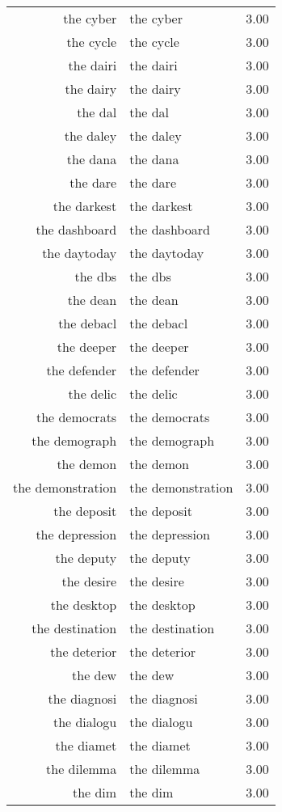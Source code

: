 \begin{table}[ht]
\begin{tabular}{rlr}
  the cyber & the cyber & 3.00 \\ 
  the cycle & the cycle & 3.00 \\ 
  the dairi & the dairi & 3.00 \\ 
  the dairy & the dairy & 3.00 \\ 
  the dal & the dal & 3.00 \\ 
  the daley & the daley & 3.00 \\ 
  the dana & the dana & 3.00 \\ 
  the dare & the dare & 3.00 \\ 
  the darkest & the darkest & 3.00 \\ 
  the dashboard & the dashboard & 3.00 \\ 
  the daytoday & the daytoday & 3.00 \\ 
  the dbs & the dbs & 3.00 \\ 
  the dean & the dean & 3.00 \\ 
  the debacl & the debacl & 3.00 \\ 
  the deeper & the deeper & 3.00 \\ 
  the defender & the defender & 3.00 \\ 
  the delic & the delic & 3.00 \\ 
  the democrats & the democrats & 3.00 \\ 
  the demograph & the demograph & 3.00 \\ 
  the demon & the demon & 3.00 \\ 
  the demonstration & the demonstration & 3.00 \\ 
  the deposit & the deposit & 3.00 \\ 
  the depression & the depression & 3.00 \\ 
  the deputy & the deputy & 3.00 \\ 
  the desire & the desire & 3.00 \\ 
  the desktop & the desktop & 3.00 \\ 
  the destination & the destination & 3.00 \\ 
  the deterior & the deterior & 3.00 \\ 
  the dew & the dew & 3.00 \\ 
  the diagnosi & the diagnosi & 3.00 \\ 
  the dialogu & the dialogu & 3.00 \\ 
  the diamet & the diamet & 3.00 \\ 
  the dilemma & the dilemma & 3.00 \\ 
  the dim & the dim & 3.00 \\ 

\end{tabular}
\end{table}
